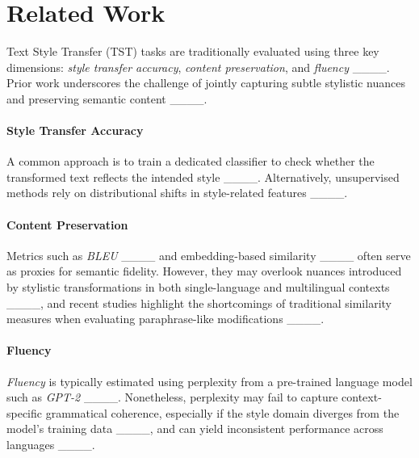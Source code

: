 \section{Related Work}
\label{sec:related_work}

Text Style Transfer (\textsc{TST}) tasks are traditionally evaluated using three key dimensions: \emph{style transfer accuracy}, \emph{content preservation}, and \emph{fluency} ____. Prior work underscores the challenge of jointly capturing subtle stylistic nuances and preserving semantic content ____.

\paragraph{Style Transfer Accuracy}
A common approach is to train a dedicated classifier to check whether the transformed text reflects the intended style ____. Alternatively, unsupervised methods rely on distributional shifts in style-related features ____.

\paragraph{Content Preservation}
Metrics such as \emph{BLEU} ____ and embedding-based similarity ____ often serve as proxies for semantic fidelity. However, they may overlook nuances introduced by stylistic transformations in both single-language and multilingual contexts ____, and recent studies highlight the shortcomings of traditional similarity measures when evaluating paraphrase-like modifications ____.

\paragraph{Fluency}
\emph{Fluency} is typically estimated using perplexity from a pre-trained language model such as \emph{GPT-2} ____. Nonetheless, perplexity may fail to capture context-specific grammatical coherence, especially if the style domain diverges from the model’s training data ____, and can yield inconsistent performance across languages ____.